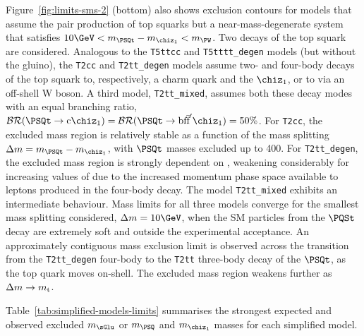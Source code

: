 Figure~\ref{fig:limits-sms-2} (bottom) also shows exclusion contours
for models that assume the pair production of top squarks but a
near-mass-degenerate system that satisfies $10\GeV < m_{\PSQt} -
m_{\chiz_1} < m_\PW$. Two decays of the top squark are
considered. Analogous to the \texttt{T5ttcc} and
\texttt{T5tttt\_degen} models (but without the gluino), the
\texttt{T2cc} and \texttt{T2tt\_degen} models assume two- and
four-body decays of the top squark to, respectively, a charm quark and
the $\chiz_1$, or to via an off-shell W boson. A third model,
\texttt{T2tt\_mixed}, assumes both these decay modes with an equal
branching ratio, $\mathcal{BR}(\PSQt \ra \text{c}\chiz_1) =
\mathcal{BR}(\PSQt \ra \text{bf}\bar{\text{f}}'\chiz_1) = 50\%$. For
\texttt{T2cc}, the excluded mass region is relatively stable as a
function of the mass splitting $\dm = m_{\PSQt} - m_{\chiz_1}$, with
$\PSQt$ masses excluded up to 400\GeV. For \texttt{T2tt\_degen}, the
excluded mass region is strongly dependent on \dm, weakening
considerably for increasing values of \dm due to the increased
momentum phase space available to leptons produced in the four-body
decay. The model \texttt{T2tt\_mixed} exhibits an intermediate
behaviour. Mass limits for all three models converge for the smallest
mass splitting considered, $\dm = 10\GeV$, when the SM particles from
the $\PQSt$ decay are extremely soft and outside the experimental
acceptance. An approximately contiguous mass exclusion limit is
observed across the transition from the \texttt{T2tt\_degen} four-body
to the \texttt{T2tt} three-body decay of the $\PSQt$, as the top quark
moves on-shell. The excluded mass region weakens further as $\Delta m \rightarrow
m_\text{t}$.

Table~\ref{tab:simplified-models-limits} summarises the strongest
expected and observed excluded $m_{\sGlu}$ or $m_{\PSQ}$ and
$m_{\chiz_1}$ masses for each simplified model.

